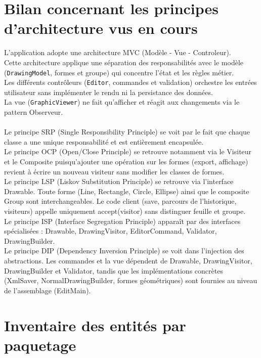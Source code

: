 \documentclass[11pt,a4paper]{article}
\begin{document}
\section{Bilan concernant les principes d'architecture vus en cours}

L'application adopte une architecture MVC (Modèle - Vue - Controleur).\\
Cette architecture applique une séparation des responsabilités avec le modèle (\texttt{DrawingModel}, formes et groupe) qui concentre l'état et les règles métier.\\
Les différents contrôleurs (\texttt{Editor}, commandes et validation) orchestre les entrées utilisateur sans implémenter le rendu ni la persistance des données.\\
La vue (\texttt{GraphicViewer}) ne fait qu'afficher et réagit aux changements via le pattern Observeur.\\\\

Le principe SRP (Single Responsibility Principle) se voit par le fait que chaque classe a une unique responsabilité et est entièrement encapsulée.\\
Le principe OCP (Open/Close Principle) se retrouve notamment via le Visiteur et le Composite puisqu'ajouter une opération sur les formes (export, affichage) revient à écrire un nouveau visiteur sans modifier les classes de formes.\\
Le principe LSP (Liskov Substitution Principle) se retrouve via l’interface Drawable. Toute forme (Line, Rectangle, Circle, Ellipse) ainsi que le composite Group sont interchangeables. Le code client (save, parcours de l’historique, visiteurs) appelle uniquement accept(visitor) sans distinguer feuille et groupe.\\
Le principe ISP (Interface Segregation Principle) apparaît par des interfaces spécialisées : Drawable, DrawingVisitor, EditorCommand, Validator, DrawingBuilder. \\
Le principe DIP (Dependency Inversion Principle) se voit dans l’injection des abstractions. Les commandes et la vue dépendent de Drawable, DrawingVisitor, DrawingBuilder et Validator, tandis que les implémentations concrètes (XmlSaver, NormalDrawingBuilder, formes géométriques) sont fournies au niveau de l’assemblage (EditMain).\\

\newpage

\appendix

\section{Inventaire des entités par paquetage}
\end{document}

